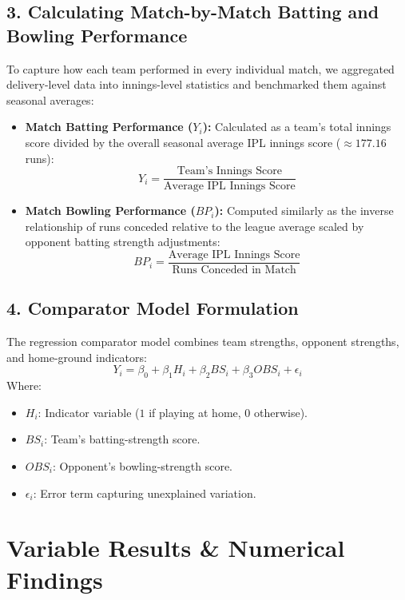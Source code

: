 \documentclass[11pt, a4paper]{article}
\begin{document}
\subsection{3. Calculating Match-by-Match Batting and Bowling Performance}
To capture how each team performed in every individual match, we aggregated delivery-level data into innings-level statistics and benchmarked them against seasonal averages:
\begin{itemize}[label=-]
    \item \textbf{Match Batting Performance ($Y_i$):} Calculated as a team's total innings score divided by the overall seasonal average IPL innings score ($\approx 177.16$ runs):
    \begin{equation}
    Y_i = \frac{\text{Team's Innings Score}}{\text{Average IPL Innings Score}}
    \end{equation}
    \item \textbf{Match Bowling Performance ($BP_i$):} Computed similarly as the inverse relationship of runs conceded relative to the league average scaled by opponent batting strength adjustments:
    \begin{equation}
    BP_i = \frac{\text{Average IPL Innings Score}}{\text{Runs Conceded in Match}}
    \end{equation}
\end{itemize}

\subsection{4. Comparator Model Formulation}
The regression comparator model combines team strengths, opponent strengths, and home-ground indicators:
\begin{equation}
Y_i = \beta_0 + \beta_1 H_i + \beta_2 BS_i + \beta_3 OBS_i + \epsilon_i
\end{equation}
Where:
\begin{itemize}[label=-]
    \item $H_i$: Indicator variable ($1$ if playing at home, $0$ otherwise).
    \item $BS_i$: Team's batting-strength score.
    \item $OBS_i$: Opponent's bowling-strength score.
    \item $\epsilon_i$: Error term capturing unexplained variation.
\end{itemize}

\section{Variable Results \& Numerical Findings}
\end{document}
